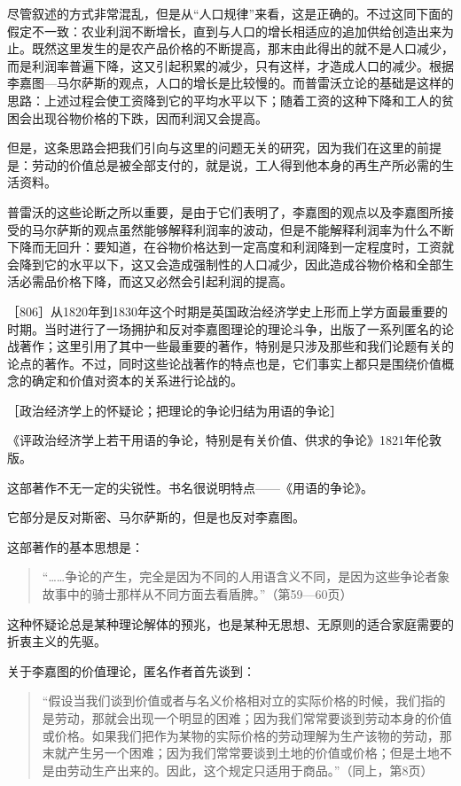 尽管叙述的方式非常混乱，但是从“人口规律”来看，这是正确的。不过这同下面的假定不一致：农业利润不断增长，直到与人口的增长相适应的追加供给创造出来为止。既然这里发生的是农产品价格的不断提高，那末由此得出的就不是人口减少，而是利润率普遍下降，这又引起积累的减少，只有这样，才造成人口的减少。根据李嘉图—马尔萨斯的观点，人口的增长是比较慢的。而普雷沃立论的基础是这样的思路：上述过程会使工资降到它的平均水平以下；随着工资的这种下降和工人的贫困会出现谷物价格的下跌，因而利润又会提高。

但是，这条思路会把我们引向与这里的问题无关的研究，因为我们在这里的前提是：劳动的价值总是被全部支付的，就是说，工人得到他本身的再生产所必需的生活资料。

普雷沃的这些论断之所以重要，是由于它们表明了，李嘉图的观点以及李嘉图所接受的马尔萨斯的观点虽然能够解释利润率的波动，但是不能解释利润率为什么不断下降而无回升：要知道，在谷物价格达到一定高度和利润降到一定程度时，工资就会降到它的水平以下，这又会造成强制性的人口减少，因此造成谷物价格和全部生活必需品价格下降，而这又必然会引起利润的提高。


［806］从1820年到1830年这个时期是英国政治经济学史上形而上学方面最重要的时期。当时进行了一场拥护和反对李嘉图理论的理论斗争，出版了一系列匿名的论战著作；这里引用了其中一些最重要的著作，特别是只涉及那些和我们论题有关的论点的著作。不过，同时这些论战著作的特点也是，它们事实上都只是围绕价值概念的确定和价值对资本的关系进行论战的。


［政治经济学上的怀疑论；把理论的争论归结为用语的争论］

《评政治经济学上若干用语的争论，特别是有关价值、供求的争论》1821年伦敦版。

这部著作不无一定的尖锐性。书名很说明特点——《用语的争论》。

它部分是反对斯密、马尔萨斯的，但是也反对李嘉图。

这部著作的基本思想是：

\begin{quote}{“……争论的产生，完全是因为不同的人用语含义不同，是因为这些争论者象故事中的骑士那样从不同方面去看盾脾。”（第59—60页）}\end{quote}

这种怀疑论总是某种理论解体的预兆，也是某种无思想、无原则的适合家庭需要的折衷主义的先驱。

关于李嘉图的价值理论，匿名作者首先谈到：

\begin{quote}{“假设当我们谈到价值或者与名义价格相对立的实际价格的时候，我们指的是劳动，那就会出现一个明显的困难；因为我们常常要谈到劳动本身的价值或价格。如果我们把作为某物的实际价格的劳动理解为生产该物的劳动，那末就产生另一个困难；因为我们常常要谈到土地的价值或价格；但是土地不是由劳动生产出来的。因此，这个规定只适用于商品。”（同上，第8页）}\end{quote}

